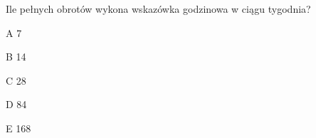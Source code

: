 \begin{tresc}
Ile pełnych obrotów wykona wskazówka godzinowa w ciągu tygodnia?
\end{tresc}
\begin{wariant}{A} 7 \end{wariant}
\begin{wariant}{B} 14 \end{wariant}
\begin{wariant}{C} 28 \end{wariant}
\begin{wariant}{D} 84 \end{wariant}
\begin{wariant}{E} 168 \end{wariant}
